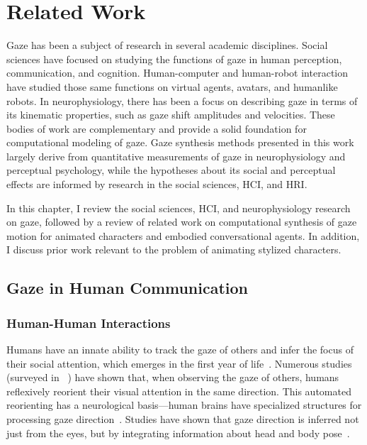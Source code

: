 \pagestyle{deposit}

\chapter{Related Work}

Gaze has been a subject of research in several academic disciplines. Social sciences have focused on studying the functions of gaze in human perception, communication, and cognition. Human-computer and human-robot interaction have studied those same functions on virtual agents, avatars, and humanlike robots. In neurophysiology, there has been a focus on describing gaze in terms of its kinematic properties, such as gaze shift amplitudes and velocities. These bodies of work are complementary and provide a solid foundation for computational modeling of gaze. Gaze synthesis methods presented in this work largely derive from quantitative measurements of gaze in neurophysiology and perceptual psychology, while the hypotheses about its social and perceptual effects are informed by research in the social sciences, HCI, and HRI.

In this chapter, I review the social sciences, HCI, and neurophysiology research on gaze, followed by a review of related work on computational synthesis of gaze motion for animated characters and embodied conversational agents. In addition, I discuss prior work relevant to the problem of animating stylized characters.

\section{Gaze in Human Communication}
\label{sec:GazeHumanCommunication}

\subsection{Human-Human Interactions}

Humans have an innate ability to track the gaze of others and infer the focus of their social attention, which emerges in the first year of life~\citep{scaife1975infant,vecera1995detection}. Numerous studies (surveyed in ~\citep{langton2000eyes}) have shown that, when observing the gaze of others, humans reflexively reorient their visual attention in the same direction. This automated reorienting has a neurological basis---human brains have specialized structures for processing gaze direction~\citep{emery2000eyes}. Studies have shown that gaze direction is inferred not just from the eyes, but by integrating information about head and body pose~\citep{hietanen1999does,langton2000eyes,hietanen2002social,pomianowska2011socialcues}.

